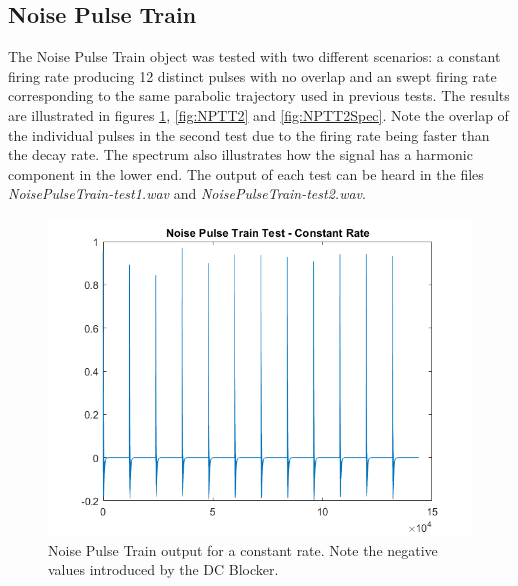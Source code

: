\documentclass[../main.tex]{subfiles}
\begin{document}
\subsection{Noise Pulse Train}
The Noise Pulse Train object was tested with two different scenarios: a constant firing rate producing 12 distinct pulses with no overlap and an swept firing rate corresponding to the same parabolic trajectory used in previous tests. The results are illustrated in figures \ref{fig:NPTT1}, \ref{fig:NPTT2} and \ref{fig:NPTT2Spec}. Note the overlap of the individual pulses in the second test due to the firing rate being faster than the decay rate. The spectrum also illustrates how the signal has a harmonic component in the lower end. The output of each test can be heard in the files \emph{NoisePulseTrain-test1.wav} and \emph{NoisePulseTrain-test2.wav}.

\begin{figure}[h]
    \centering
    \includegraphics[scale=.65]{./images/plots/NPTTest1.png}
    \caption{Noise Pulse Train output for a constant rate. Note the negative values introduced by the DC Blocker.}
    \label{fig:NPTT1}
\end{figure}
\end{document}
